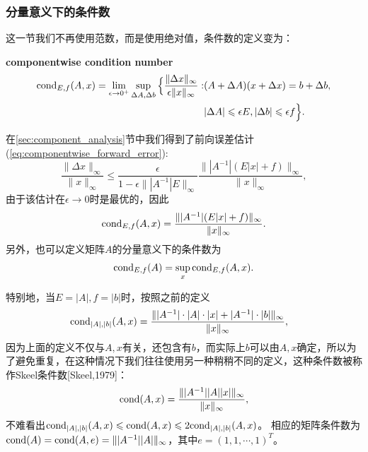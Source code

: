 \documentclass[a4paper,10pt]{ctexart}
\begin{document}
\subsubsection{分量意义下的条件数}
这一节我们不再使用范数，而是使用绝对值，条件数的定义变为：
\begin{definition}\bf{\textup{componentwise condition number}}
    \begin{equation}
        \begin{aligned}
            {\rm cond}_{E,f}(A,x) = \lim_{\epsilon\to 0^+} \sup_{\Delta A, \Delta b} \Big\lbrace \frac{\| \Delta x \|_\infty}{\epsilon \| x \|_\infty}: 
            &(A+\Delta A)(x+\Delta x) = b + \Delta b, \\
            &| \Delta A |\leqslant \epsilon E , | \Delta b | \leqslant \epsilon f\Big\rbrace.
        \end{aligned}
    \end{equation}
\end{definition}
\noindent 在\ref{sec:component_analysis}节中我们得到了前向误差估计(\ref{eq:componentwise_forward_error}):
\begin{equation}
    \frac{\| \Delta x \|_\infty}{\| x \|_\infty} \leqslant \frac{\epsilon}{1-\epsilon \| |A^{-1}|E \|_\infty}  \frac{\| |A^{-1}|(E|x|+f) \|_\infty}{\| x \|_\infty },
\end{equation}
由于该估计在$ \epsilon\to 0 $时是最优的，因此
\begin{equation}
    {\rm cond}_{E,f}(A,x) = \frac{\| |A^{-1}|(E|x|+f) \|_\infty}{\| x \|_\infty }.
\end{equation}
另外，也可以定义矩阵$ A $的分量意义下的条件数为
\[
    {\rm cond}_{E,f}(A) = \sup_x {\rm cond}_{E,f}(A,x).
\]

特别地，当$ E=|A|,f=|b| $时，按照之前的定义
\[
    \begin{aligned}
        {\rm cond}_{|A|,|b|}(A,x) &= \frac{\| |A^{-1}|\cdot |A|\cdot|x| + |A^{-1}|\cdot |b| \|_\infty }{\| x \|_\infty },
    \end{aligned}
\]
因为上面的定义不仅与$ A,x $有关，还包含有$ b $，而实际上$ b $可以由$ A,x $确定，所以为了避免重复，在这种情况下我们往往使用另一种稍稍不同的定义，这种条件数被称作Skeel条件数[Skeel,1979]：
\begin{equation}
    {\rm cond}(A,x) = \frac{\| |A^{-1}| |A| |x| \|_\infty }{\| x \|_\infty },
\end{equation}
不难看出$ {\rm cond}_{|A|,|b|}(A,x) \leqslant {\rm cond}(A,x) \leqslant 2{\rm cond}_{|A|,|b|}(A,x) $。
相应的矩阵条件数为$ {\rm cond}(A) = {\rm cond}(A,e) = \| |A^{-1}||A| \|_\infty$，其中$ e = (1,1,\cdots ,1)^T $。
\end{document}
